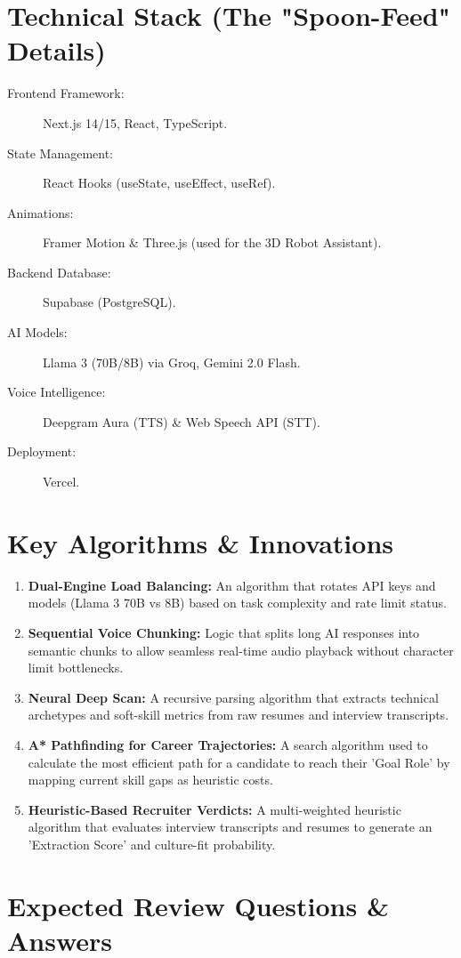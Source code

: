 \documentclass[12pt]{article}
\begin{document}
\section{Technical Stack (The "Spoon-Feed" Details)}
\begin{description}
    \item[Frontend Framework:] Next.js 14/15, React, TypeScript.
    \item[State Management:] React Hooks (useState, useEffect, useRef).
    \item[Animations:] Framer Motion \& Three.js (used for the 3D Robot Assistant).
    \item[Backend Database:] Supabase (PostgreSQL).
    \item[AI Models:] Llama 3 (70B/8B) via Groq, Gemini 2.0 Flash.
    \item[Voice Intelligence:] Deepgram Aura (TTS) \& Web Speech API (STT).
    \item[Deployment:] Vercel.
\end{description}

\section{Key Algorithms \& Innovations}
\begin{enumerate}
    \item \textbf{Dual-Engine Load Balancing:} An algorithm that rotates API keys and models (Llama 3 70B vs 8B) based on task complexity and rate limit status.
    \item \textbf{Sequential Voice Chunking:} Logic that splits long AI responses into semantic chunks to allow seamless real-time audio playback without character limit bottlenecks.
    \item \textbf{Neural Deep Scan:} A recursive parsing algorithm that extracts technical archetypes and soft-skill metrics from raw resumes and interview transcripts.
    \item \textbf{A* Pathfinding for Career Trajectories:} A search algorithm used to calculate the most efficient path for a candidate to reach their 'Goal Role' by mapping current skill gaps as heuristic costs.
    \item \textbf{Heuristic-Based Recruiter Verdicts:} A multi-weighted heuristic algorithm that evaluates interview transcripts and resumes to generate an 'Extraction Score' and culture-fit probability.
\end{enumerate}

\section{Expected Review Questions \& Answers}
\end{document}
